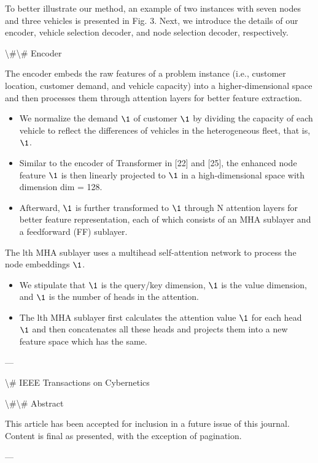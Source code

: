 \documentclass{article}
\begin{document}
	To better illustrate our method, an example of two instances with seven nodes and three vehicles is presented in Fig. 3. Next, we introduce the details of our encoder, vehicle selection decoder, and node selection decoder, respectively.
	
	\textbackslash{}#\textbackslash{}# Encoder
	
	The encoder embeds the raw features of a problem instance (i.e., customer location, customer demand, and vehicle capacity) into a higher-dimensional space and then processes them through attention layers for better feature extraction.
	
	\begin{itemize}
		\item We normalize the demand $\1$ of customer $\1$ by dividing the capacity of each vehicle to reflect the differences of vehicles in the heterogeneous fleet, that is, $\1$.
		\item Similar to the encoder of Transformer in [22] and [25], the enhanced node feature $\1$ is then linearly projected to $\1$ in a high-dimensional space with dimension dim = 128.
		\item Afterward, $\1$ is further transformed to $\1$ through N attention layers for better feature representation, each of which consists of an MHA sublayer and a feedforward (FF) sublayer.
	\end{itemize}
	
	The lth MHA sublayer uses a multihead self-attention network to process the node embeddings $\1$.
	
	\begin{itemize}
		\item We stipulate that $\1$ is the query/key dimension, $\1$ is the value dimension, and $\1$ is the number of heads in the attention.
		\item The lth MHA sublayer first calculates the attention value $\1$ for each head $\1$ and then concatenates all these heads and projects them into a new feature space which has the same.
	\end{itemize}
	
	---
	
	\textbackslash{}# IEEE Transactions on Cybernetics
	
	\textbackslash{}#\textbackslash{}# Abstract
	
	This article has been accepted for inclusion in a future issue of this journal. Content is final as presented, with the exception of pagination.
	
	---
	
\end{document}

